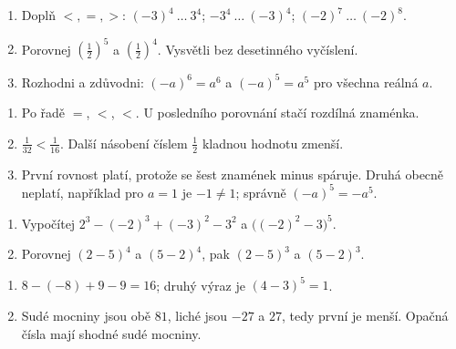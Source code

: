\documentclass[11pt,a4paper]{article}
\begin{document}
\begin{zadaniReseniBox}[title={Základ a navazující úvaha: porovnávání},breakable=false]
\begin{enumerate}[label=\alph*)]
\item Doplň $<,=,>$: $(-3)^4\ \ldots\ 3^4$; $-3^4\ \ldots\ (-3)^4$; $(-2)^7\ \ldots\ (-2)^8$.
\item Porovnej $(\tfrac12)^5$ a $(\tfrac12)^4$. Vysvětli bez desetinného vyčíslení.
\item Rozhodni a zdůvodni: $(-a)^6=a^6$ a $(-a)^5=a^5$ pro všechna reálná $a$.
\end{enumerate}
\tcblower
\begin{enumerate}[label=\alph*)]
\item Po řadě $=$, $<$, $<$. U posledního porovnání stačí rozdílná znaménka.
\item $\frac1{32}<\frac1{16}$. Další násobení číslem $\frac12$ kladnou hodnotu zmenší.
\item První rovnost platí, protože se šest znamének minus spáruje. Druhá obecně neplatí, například pro $a=1$ je $-1\ne1$; správně $(-a)^5=-a^5$.
\end{enumerate}
\end{zadaniReseniBox}

\begin{zadaniReseniBox}[title={Rezerva: propojené výpočty},breakable=false]
\begin{enumerate}[label=\alph*)]
\item Vypočítej $2^3-(-2)^3+(-3)^2-3^2$ a $\bigl((-2)^2-3\bigr)^5$.
\item Porovnej $(2-5)^4$ a $(5-2)^4$, pak $(2-5)^3$ a $(5-2)^3$.
\end{enumerate}
\tcblower
\begin{enumerate}[label=\alph*)]
\item $8-(-8)+9-9=16$; druhý výraz je $(4-3)^5=1$.
\item Sudé mocniny jsou obě $81$, liché jsou $-27$ a $27$, tedy první je menší. Opačná čísla mají shodné sudé mocniny.
\end{enumerate}
\end{zadaniReseniBox}


\end{document}
